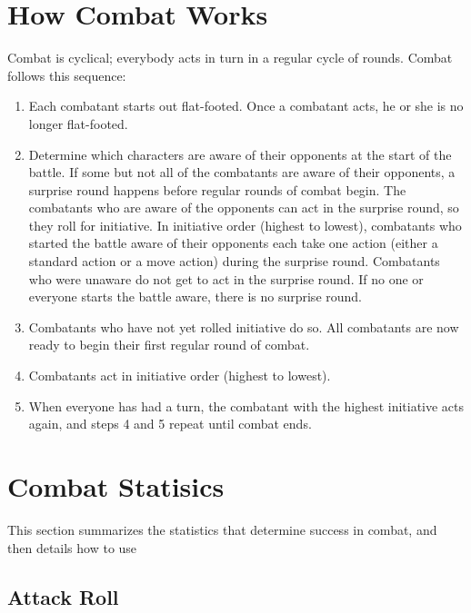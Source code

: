 \section{How Combat Works}

Combat is cyclical; everybody acts in turn in a regular cycle of rounds. Combat 
follows this sequence:

\begin{enumerate}
\item Each combatant starts out flat-footed. Once a combatant acts, he or she is no  longer flat-footed.
\item Determine which characters are aware of their opponents at the start of the  battle. If some but not all of the combatants are aware of their opponents, a surprise round happens before regular rounds of combat begin. The combatants who are aware of the opponents can act in the surprise round, so they roll for initiative. In initiative order (highest to lowest), combatants who started the battle aware of their opponents each take one action (either a standard action or a move action) during the surprise round. Combatants who were unaware do not get to act in the surprise round. If no one or everyone starts the battle aware, there is no surprise round.
\item Combatants who have not yet rolled initiative do so. All combatants are now ready to begin their first regular round of combat.
\item Combatants act in initiative order (highest to lowest).
\item When everyone has had a turn, the combatant with the highest initiative acts again, and steps 4 and 5 repeat until combat ends.
\end{enumerate}

\section{Combat Statisics}

This section summarizes the statistics that determine success in combat, and then details how to use

\subsection{Attack Roll}

